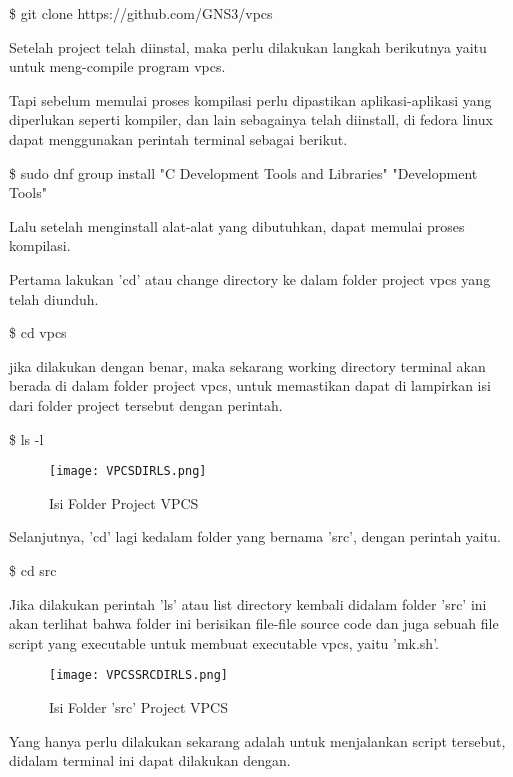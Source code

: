 \documentclass[12pt, a4paper]{article}
\begin{document}
\begin{enumerate}[label=\arabic*.]
          \$ git clone https://github.com/GNS3/vpcs

          Setelah project telah diinstal, maka perlu dilakukan langkah berikutnya
          yaitu untuk meng-compile program vpcs.

          Tapi sebelum memulai proses kompilasi perlu dipastikan aplikasi-aplikasi
          yang diperlukan seperti kompiler, dan lain sebagainya telah diinstall,
          di fedora linux dapat menggunakan perintah terminal sebagai berikut.

          \$ sudo dnf group install "C Development Tools and Libraries" "Development Tools"

          Lalu setelah menginstall alat-alat yang dibutuhkan, dapat memulai
          proses kompilasi.

          Pertama lakukan 'cd' atau change directory ke dalam folder project
          vpcs yang telah diunduh.

          \$ cd vpcs

          jika dilakukan dengan benar, maka sekarang working directory terminal
          akan berada di dalam folder project vpcs, untuk memastikan dapat
          di lampirkan isi dari folder project tersebut dengan perintah.

          \$ ls -l

          \begin{figure}[h]
              \centering
              \texttt{[image: VPCSDIRLS.png]}
              \caption{\small{Isi Folder Project VPCS}}
          \end{figure}


          Selanjutnya, 'cd' lagi kedalam folder yang bernama 'src', dengan perintah
          yaitu.

          \$ cd src

          Jika dilakukan perintah 'ls' atau list directory kembali didalam
          folder 'src' ini akan terlihat bahwa folder ini berisikan file-file
          source code dan juga sebuah file script yang executable untuk membuat
          executable vpcs, yaitu 'mk.sh'.


          \begin{figure}[h]
              \centering
              \texttt{[image: VPCSSRCDIRLS.png]}
              \caption{\small{Isi Folder 'src' Project VPCS}}
          \end{figure}


          Yang hanya perlu dilakukan sekarang adalah untuk menjalankan
          script tersebut, didalam terminal ini dapat dilakukan dengan.


\end{enumerate}
\end{document}
